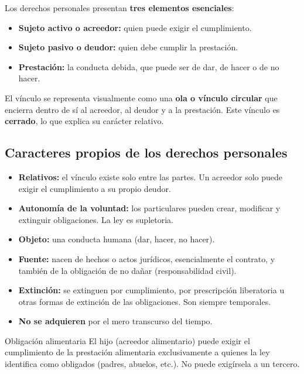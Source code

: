 \documentclass[12pt,oneside]{book}
\begin{document}
Los derechos personales presentan \textbf{tres elementos esenciales}:

\begin{itemize}
    \item \textbf{Sujeto activo o acreedor:} quien puede exigir el cumplimiento.
    \item \textbf{Sujeto pasivo o deudor:} quien debe cumplir la prestaci\'on.
    \item \textbf{Prestaci\'on:} la conducta debida, que puede ser de dar, de hacer o de no hacer.
\end{itemize}

El v\'inculo se representa visualmente como una \textbf{ola o v\'inculo circular} que encierra dentro de s\'i al acreedor, al deudor y a la prestaci\'on. Este v\'inculo es \textbf{cerrado}, lo que explica su car\'acter relativo.

\subsection{Caracteres propios de los derechos personales}

\begin{itemize}
    \item \textbf{Relativos:} el v\'inculo existe solo entre las partes. Un acreedor solo puede exigir el cumplimiento a su propio deudor.
    \item \textbf{Autonom\'ia de la voluntad:} los particulares pueden crear, modificar y extinguir obligaciones. La ley es supletoria.
    \item \textbf{Objeto:} una conducta humana (dar, hacer, no hacer).
    \item \textbf{Fuente:} nacen de hechos o actos jur\'idicos, esencialmente el contrato, y tambi\'en de la obligaci\'on de no da\~nar (responsabilidad civil).
    \item \textbf{Extinci\'on:} se extinguen por cumplimiento, por prescripci\'on liberatoria u otras formas de extinci\'on de las obligaciones. Son siempre temporales.
    \item \textbf{No se adquieren} por el mero transcurso del tiempo.
\end{itemize}

\begin{example}{Obligaci\'on alimentaria}
El hijo (acreedor alimentario) puede exigir el cumplimiento de la prestaci\'on alimentaria exclusivamente a quienes la ley identifica como obligados (padres, abuelos, etc.). No puede exig\'irsela a un tercero.
\end{example}
\end{document}
